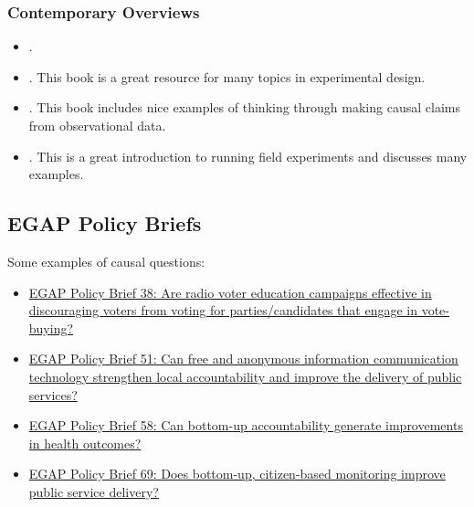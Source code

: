 \documentclass[12pt,]{book}
\begin{document}
\hypertarget{contemporary-overviews}{%
\subsubsection{Contemporary Overviews}\label{contemporary-overviews}}

\begin{itemize}
\item
  \autocite{brady2008causation}.
\item
  \autocite[Chapter 1]{gerber_field_2012}. This book is a great resource for many topics in experimental design.
\item
  \autocite[Chapter 1]{morgan_counterfactuals_2007}. This book includes nice examples of thinking through making causal claims from observational data.
\item
  \autocite{glennerster_running_2013}. This is a great introduction to running field experiments and discusses many examples.
\end{itemize}

\hypertarget{egap-policy-briefs}{%
\subsection{EGAP Policy Briefs}\label{egap-policy-briefs}}

Some examples of causal questions:

\begin{itemize}
\item
  \href{https://egap.org/resource/brief-38-diminishing-the-effectiveness-of-vote-buying-through-voter-education/}{EGAP Policy Brief 38: Are radio voter education campaigns effective in discouraging voters from voting for parties/candidates that engage in vote-buying?}
\item
  \href{https://egap.org/resource/does-information-technology-improve-public-service-delivery-lessons-from-uganda/}{EGAP Policy Brief 51: Can free and anonymous information communication technology strengthen local accountability and improve the delivery of public services?}
\item
  \href{https://egap.org/resource/does-bottom-up-accountability-work-evidence-from-uganda/}{EGAP Policy Brief 58: Can bottom-up accountability generate improvements in health outcomes?}
\item
  \href{https://egap.org/resource/brief-69-bottom-up-accountability-and-public-service-provision-in-brazil/}{EGAP Policy Brief 69: Does bottom-up, citizen-based monitoring improve public service delivery?}
\end{itemize}
\end{document}
